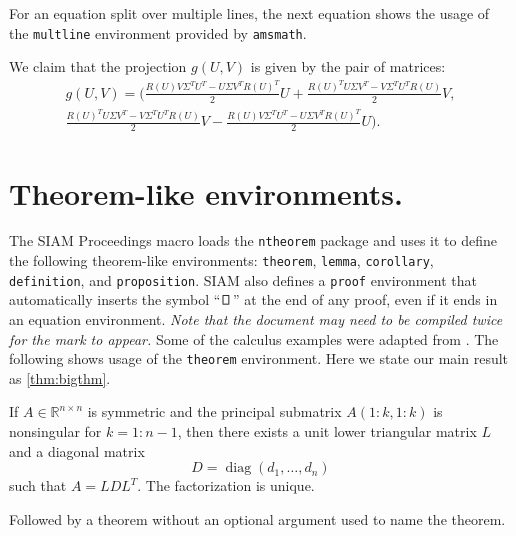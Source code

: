 \documentclass[twoside,leqno]{article}
\DeclareMathOperator{\diag}{diag}
\begin{document}
For an equation split over multiple lines, the next equation shows the
usage of the \texttt{multline} environment provided by \texttt{amsmath}.

We claim that the projection $g(U,V)$ is given by the pair of matrices:
\begin{multline} \label{eq:ml}
  g(U,V) = \biggl( \frac{R(U)V\Sigma^{T}U^{T} - U\Sigma V^{T}R(U)^{T}}{2}U + \frac{R(U)^{T}U\Sigma V^{T}-V \Sigma^{T}U^{T}R(U)}{2}V,\\
   \frac{R(U)^{T}U\Sigma V^{T}-V \Sigma^{T}U^{T}R(U)}{2}V - \frac{R(U)V\Sigma^{T}U^{T} - U\Sigma V^{T}R(U)^{T}}{2}U \biggr).
\end{multline}

\section{Theorem-like environments.}
\label{sec:thm}
The SIAM Proceedings macro loads the \texttt{ntheorem} package and uses it to define the following
theorem-like environments:
\texttt{theorem}, 
\texttt{lemma}, 
\texttt{corollary},
\texttt{definition}, and
\texttt{proposition}.
SIAM also defines a \texttt{proof} environment that automatically
inserts the symbol ``$\,\proofbox\,$'' at the end of any proof, even if it ends in an
equation environment. \emph{Note that the document may need to be
  compiled twice for the mark to appear.}
Some of the calculus examples were adapted from \cite{CalcI}. 
%
%
The following shows usage of the \texttt{theorem} environment. 
Here we state our main result as \cref{thm:bigthm}.

\begin{theorem}\label{thm:bigthm}
  If $A \in \mathbb{R}^{n \times n}$ is symmetric and the principal
  submatrix $A(1:k,1:k)$ is nonsingular for $k=1:n-1$, then there
  exists a unit lower triangular matrix $L$ and a diagonal matrix
  \begin{displaymath}
    D = \diag(d_1,\dots,d_n)
  \end{displaymath}
  such that $A=LDL^T$. The factorization is unique.
\end{theorem}

Followed by a theorem without an optional argument used to name the theorem.
\end{document}
